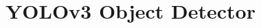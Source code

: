 \section{YOLOv3 Object Detector}
\label{sec:background/section_a}


\begin{comment}

As one of the deep learning-based and one-stage object detectors whereby the full image itself is applied to the single neural network, You Only Look Once (YOLO) was considered for our object detection component in the object tracking system. The following conceptual background in YOLO was described by \citeauthor{redmon_you_2016} \cite{redmon_you_2016}. YOLO is a convolutional neural network-based model, and it divides the input image into $S \times S$ grids. Each cell in the grids is responsible for predicting the dimension of $B$ number of bounding boxes. Each bounding box has a center coordinate of $x, y$ and width, and the height of $w, h$ as a dimension, and Intersection over Union (IOU) can be calculated between the dimension of the predicted bounding box and ground truth bounding box. Each cell also predicts the probability of the object contained by the bounding box and the conditional probability of the object belonging to a specific class given the object contained by the bounding box. Based on these three predictions, YOLO gives the class-specific confidence value as,
\begin{equation}
P(class_i | object) \times P(Object) \times IOU = P(class_i) \times IOU,
\label{eq:yolo_conf}
\end{equation}
which is given by \citeauthor{redmon_you_2016}. The dimension of final prediction tensor will be $S \times S \times (B \times 5 + C)$ where $C$ is the number of classes we want to detect and the value 5 contains $x$, $y$, $w$, $h$, and the class-specific confidence score.


\end{comment}
